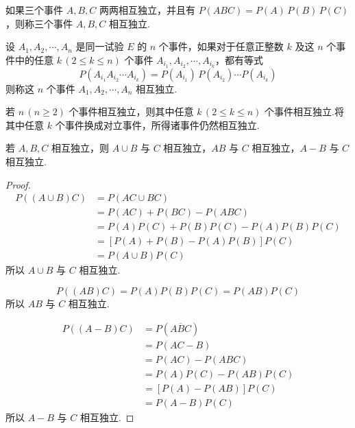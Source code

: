 \begin{definition}
    \indent 如果三个事件 $A,B,C$ 两两相互独立，并且有 $P(ABC)=P(A)\,P(B)\,P(C)$，则称三个事件 $A,B,C$ {\heiti 相互独立}.
\end{definition}

\begin{definition}
    \indent 设 $A_1,A_2,\cdots,A_n$ 是同一试验 $E$ 的 $n$ 个事件，如果对于任意正整数 $k$ 及这 $n$ 个事件中的任意 $k\,(2\leqslant k\leqslant n)$ 个事件 $A_{i_1},A_{i_2},\cdots,A_{i_k}$，都有等式
    $$
    P(A_{i_1} A_{i_2} \cdots A_{i_k}) = P(A_{i_1}) \, P(A_{i_2}) \cdots P(A_{i_k})
    $$
    则称这 $n$ 个事件 $A_1,A_2,\cdots,A_n$ {\heiti 相互独立}.
\end{definition}

若 $n\, (n \geqslant 2)$ 个事件相互独立，则其中任意 $k\, (2 \leqslant k \leqslant n)$ 个事件相互独立.将其中任意 $k$ 个事件换成对立事件，所得诸事件仍然相互独立.

\begin{conclusion}
    \indent 若 $A,B,C$ 相互独立，则 $A \cup B$ 与 $C$ 相互独立，$AB$ 与 $C$ 相互独立，$A-B$ 与 $C$ 相互独立.
\end{conclusion}

\begin{proof}
    $$
    \begin{aligned}
        P((A \cup B) C) &= P(AC \cup BC) \\
        &= P(AC) + P(BC) - P(ABC) \\
        &= P(A) P(C) + P(B) P(C) - P(A) P(B) P(C) \\
        &= [P(A) + P(B) - P(A) P(B)] P(C) \\
        &= P(A \cup B) P(C)
    \end{aligned}
    $$
    所以 $A \cup B$ 与 $C$ 相互独立.

    \vspace{-0.5em}

    $$
    P((AB)C) = P(A) P(B) P(C) = P(AB) P(C)
    $$
    所以 $AB$ 与 $C$ 相互独立.

    \vspace{-0.5em}

    $$
    \begin{aligned}
        P((A-B)C) &= P(A \overline{B} C) \\
        &= P(AC-B) \\
        &= P(AC) - P(ABC) \\
        &= P(A) P(C) - P(AB) P(C) \\
        &= [P(A) - P(AB)] P(C) \\
        &= P(A-B) P(C)
    \end{aligned}
    $$
    所以 $A-B$ 与 $C$ 相互独立.
\end{proof}

